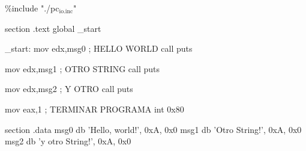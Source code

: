 \documentclass[11pt]{article}
\author{Galindo}
\date{\today}
\title{}
\begin{document}
\tableofcontents

\%include "./pc\(_{\text{io.inc}}\)"

section	.text
global \_start

\_start:
    mov edx,msg0                ; HELLO WORLD
    call puts

mov edx,msg1                ; OTRO STRING
call puts

mov edx,msg2                ; Y OTRO
call puts

mov	eax,1                   ; TERMINAR PROGRAMA
int	0x80                    

section	.data
    msg0 db 'Hello, world!', 0xA, 0x0
    msg1 db 'Otro String!', 0xA, 0x0
    msg2 db 'y otro String!', 0xA, 0x0
\end{document}
